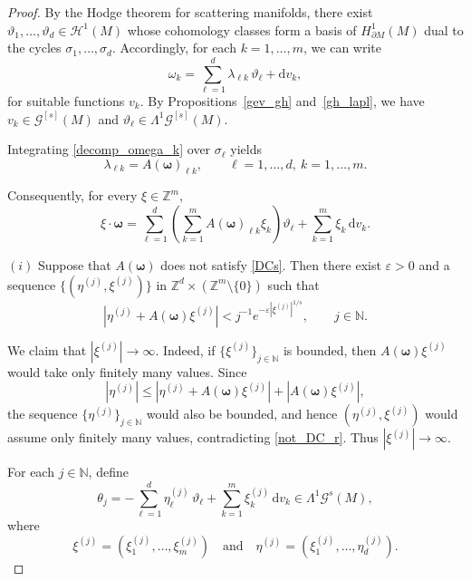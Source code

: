 \documentclass[11pt,reqno]{amsart}
\numberwithin{equation}{section}
\begin{document}
	\begin{proof}
	By the Hodge theorem for scattering manifolds, there exist 
	$\vartheta_1,\dots,\vartheta_d \in \mathcal{H}^1(M)$ whose cohomology classes form a basis of 
	$H^1_{\partial M}(M)$ dual to the cycles $\sigma_1,\dots,\sigma_d$. 
	Accordingly, for each $k=1,\dots,m$, we can write
	\begin{equation}\label{decomp_omega_k}
		\omega_k = \sum_{\ell=1}^d \lambda_{\ell k}\,\vartheta_\ell
		+ \mathrm{d}v_k,
	\end{equation}
	for suitable functions $v_k$.  By Propositions~\ref{gev_gh} and~\ref{gh_lapl}, we have $v_k\in\mathscr{G}^{[s]}(M)$ and $\vartheta_\ell \in\mathsf{\Lambda}^1 \mathscr{G}^{[s]}(M)$.
	
	Integrating \eqref{decomp_omega_k} over $\sigma_\ell$ yields
	\[
	\lambda_{\ell k} = A(\boldsymbol{\omega})_{\ell k}, \qquad \ell=1,\dots,d,\ k=1,\dots,m.
	\]
	
	Consequently, for every $\xi\in\mathbb{Z}^m$,
	\begin{equation}\label{omega}
		\xi\cdot\boldsymbol{\omega} = \sum_{\ell=1}^d \left( \sum_{k=1}^m A(\boldsymbol{\omega})_{\ell k}\xi_k \right)\vartheta_\ell + \sum_{k=1}^m \xi_k\,\mathrm{d}v_k.
	\end{equation}
	
	\medskip
	
	\noindent
	$(i)$ Suppose that $A(\boldsymbol{\omega})$ does not satisfy \eqref{DCs}. 
	Then there exist $\varepsilon>0$ and a sequence
	\(\{(\eta^{(j)},\xi^{(j)})\}\) in \(\mathbb{Z}^d \times (\mathbb{Z}^m \setminus \{0\})\) such that
	\begin{equation}\label{not_DC_r}
		|\eta^{(j)} + A(\boldsymbol{\omega})\xi^{(j)}| < j^{-1} e^{-\varepsilon |\xi^{(j)}|^{1/s}}, \qquad j\in\mathbb{N}.
	\end{equation}
	
	We claim that $|\xi^{(j)}|\to\infty$. 
	Indeed, if $\{\xi^{(j)}\}_{j\in\mathbb{N}}$ is bounded, then $A(\boldsymbol{\omega})\xi^{(j)}$ would take only finitely many values. 
	Since
	\[
	|\eta^{(j)}| \le |\eta^{(j)} + A(\boldsymbol{\omega})\xi^{(j)}| + |A(\boldsymbol{\omega})\xi^{(j)}|,
	\]
	the sequence $\{\eta^{(j)}\}_{j\in\mathbb{N}}$ would also be bounded, and hence $(\eta^{(j)},\xi^{(j)})$ would assume only finitely many values, contradicting \eqref{not_DC_r}. 
	Thus $|\xi^{(j)}|\to\infty$.
	
	For each $j\in\mathbb{N}$, define
	\begin{equation}\label{vartheta_r}
		\theta_j = -\sum_{\ell=1}^d \eta^{(j)}_\ell\,\vartheta_\ell + \sum_{k=1}^m \xi^{(j)}_k\,\mathrm{d}v_k \in		\mathsf{\Lambda}^1 \mathscr{G}^s(M),
	\end{equation}
	where
	\[\xi^{(j)}=(\xi^{(j)}_1,\dots,\xi^{(j)}_m)\quad\text{and}\quad \eta^{(j)}=(\xi^{(j)}_1,\dots,\eta^{(j)}_d).\]
	

\end{proof}
\end{document}
